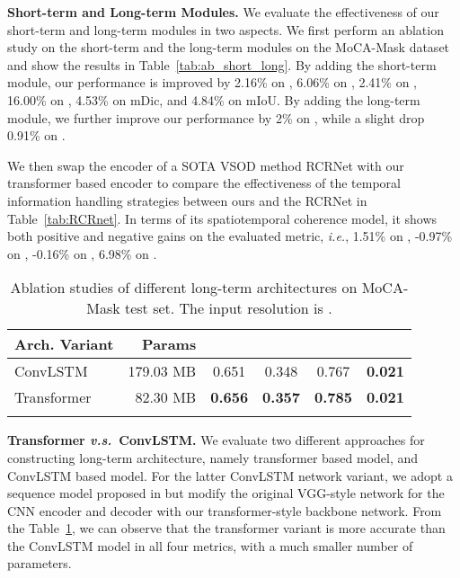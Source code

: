 \documentclass[10pt,twocolumn,letterpaper]{article}
\def\ie{\emph{i.e.}}
\def\vs{\emph{v.s.}}
\def\tabref#1{Table~\ref{#1}}
\begin{document}
\textbf{Short-term and Long-term Modules.}
We evaluate the effectiveness of our short-term and long-term modules in two aspects. We first perform an ablation study on the short-term and the long-term modules on the MoCA-Mask dataset and show the results in \tabref{tab:ab_short_long}. By adding the short-term module, our performance is improved by 2.16\% on , 6.06\% on , 2.41\% on , 16.00\% on , 4.53\% on mDic, and 4.84\% on mIoU. By adding the long-term module, we further improve our performance by 2\% on , while a slight drop 0.91\% on . 


We then swap the encoder of a SOTA VSOD method {RCRNet} \cite{yan2019semi} with our transformer based encoder to compare the effectiveness of the temporal information handling strategies between ours and the RCRNet in \tabref{tab:RCRnet}. In terms of its spatiotemporal coherence model, it shows both positive and negative gains on the evaluated metric, \ie, 1.51\% on , -0.97\% on , -0.16\% on ,  6.98\% on .




\begin{table}[t!]
    \footnotesize
    \centering
    \tabcolsep=0.22cm
    \caption{Ablation studies of different long-term architectures on MoCA-Mask test set. The input resolution is .}\label{tab:long_term_archs}
    \vspace{-5pt}
    \renewcommand{\arraystretch}{0.5}
    \begin{tabular}{lr|cccc}
    \toprule
     \textbf{Arch. Variant} & Params &  &  & & \\ 
     \midrule
      ConvLSTM & 179.03 MB & 0.651 & 0.348  & 0.767 & \textbf{0.021} \\
      Transformer   & 82.30 MB & \textbf{0.656} & \textbf{0.357} & \textbf{0.785} & \textbf{0.021} \\
    \bottomrule
    \vspace{-4mm}
    \end{tabular}
\end{table}


\textbf{Transformer \vs~ConvLSTM.}
We evaluate two different approaches for constructing long-term architecture, namely  transformer based model, and ConvLSTM based model. For the latter ConvLSTM network variant, we adopt a sequence model proposed in \cite{denton2018stochastic} but modify the original VGG-style network for the CNN encoder and decoder with our transformer-style backbone network. From the \tabref{tab:long_term_archs}, we can observe that the transformer variant is more accurate than the ConvLSTM model in all four metrics, with a much smaller number of parameters.
\end{document}
